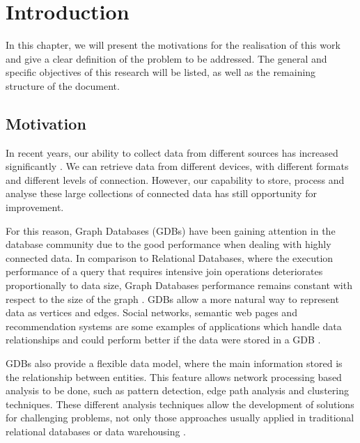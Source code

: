 \chapter{Introduction}
In this chapter, we will present the motivations for the realisation of this work and give a clear definition of the problem to be addressed. The general and specific objectives of this research will be listed, as well as the remaining structure of the document.

\section{Motivation}
In recent years, our ability to collect data from different sources has increased significantly \cite{fan2013mining}. We can retrieve data from different devices, with different formats and different levels of connection. However, our capability to store, process and analyse these large collections of connected data has still opportunity for improvement.

For this reason, Graph Databases (GDBs) have been gaining attention in the database community due to the good performance when dealing with highly connected data. In comparison to Relational Databases, where the execution performance of a query that requires intensive join operations deteriorates proportionally to data size, Graph Databases performance remains constant with respect to the size of the graph \cite{Robinson2015}. GDBs allow a more natural way to represent data as vertices and edges. Social networks, semantic web pages and recommendation systems are some examples of applications which handle data relationships and could perform better if the data were stored in a GDB \cite{Miller2013}. 

GDBs also provide a flexible data model, where the main information stored is the relationship between entities. This feature allows network processing based analysis to be done, such as pattern detection, edge path analysis and clustering techniques. These different analysis techniques allow the development of solutions for challenging problems, not only those approaches usually applied in traditional relational databases or data warehousing \cite{Loshin2013}. 

